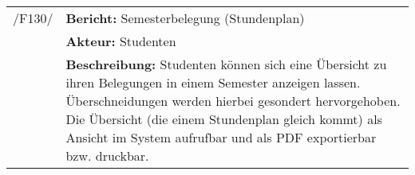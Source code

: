 \begin{tabular}{p{1.5cm}p{14.5cm}}
	
	 /F130/& \textbf{Bericht:} Semesterbelegung (Stundenplan) \\
				& \textbf{Akteur:} Studenten \\
				& \textbf{Beschreibung:} Studenten können sich eine Übersicht zu ihren Belegungen in einem Semester anzeigen lassen. Überschneidungen werden hierbei gesondert hervorgehoben. Die Übersicht (die einem Stundenplan gleich kommt) als Ansicht im System aufrufbar und als PDF exportierbar bzw. druckbar. \\[0.25cm]

				
\end{tabular}